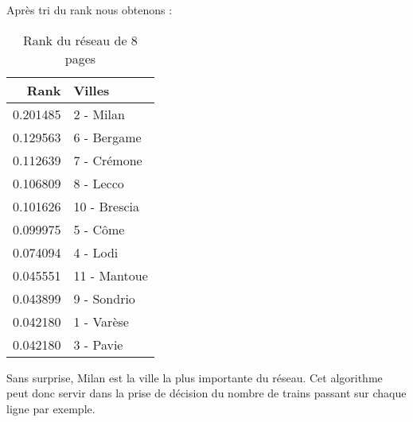 			Après tri du rank nous obtenons :
			\begin{table}[H]
				\centering
				\begin{tabular}{|r|l|}
					\hline
					Rank		& Villes	\\	\hline
					\hline
					0.201485	&  2 - Milan		\\	\hline
					0.129563	&  6 - Bergame		\\	\hline
					0.112639	&  7 - Crémone		\\	\hline
					0.106809	&  8 - Lecco		\\	\hline
					0.101626	& 10 - Brescia		\\	\hline
					0.099975	&  5 - Côme			\\	\hline
					0.074094	&  4 - Lodi			\\	\hline
					0.045551	& 11 - Mantoue		\\	\hline
					0.043899	&  9 - Sondrio		\\	\hline
					0.042180	&  1 - Varèse		\\	\hline
					0.042180	&  3 - Pavie		\\	\hline
				\end{tabular}
				\caption{Rank du réseau de 8 pages}
				\label{tb-4-rankVilles}
			\end{table}

			Sans surprise, Milan est la ville la plus importante du réseau.
			Cet algorithme peut donc servir dans la prise de décision du nombre de trains passant sur chaque ligne par exemple.


